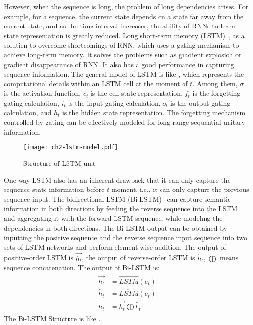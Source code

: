 However, when the sequence is long, the problem of long dependencies arises. For example, for a sequence, the current state depends on a state far away from the current state, and as the time interval increases, the ability of RNNs to learn state representation is greatly reduced. Long short-term memory (LSTM)~\cite{lstm1997}, as a solution to overcome shortcomings of RNN, which uses a gating mechanism to achieve long-term memory. It solves the problems such as gradient explosion or gradient disappearance of RNN. It also has a good performance in capturing sequence information. The general model of LSTM is like \figname{\ref{fig:ch2-lstm-model}}, which represents the computational details within an LSTM cell at the moment of \(t\). Among them, \(\sigma\) is the activation function, \(c_t\) is the cell state representation, \(f_t\) is the forgetting gating calculation, \(i_t\) is the input gating calculation, \(o_t\) is the output gating calculation, and \(h_t\) is the hidden state representation. The forgetting mechanism controlled by gating can be effectively modeled for long-range sequential unitary information.

\begin{figure}[htbp!]
    \centering
    \texttt{[image: ch2-lstm-model.pdf]}
    \caption{Structure of LSTM unit}\label{fig:ch2-lstm-model}
\end{figure}

One-way LSTM also has an inherent drawback that it can only capture the sequence state information before \(t\) moment, i.e., it can only capture the previous sequence input. The bidirectional LSTM (Bi-LSTM)~\cite{graves2005framewise} can capture semantic information in both directions by feeding the reverse sequence into the LSTM and aggregating it with the forward LSTM sequence, while modeling the dependencies in both directions. The Bi-LSTM output can be obtained by inputting the positive sequence and the reverse sequence input sequence into two sets of LSTM networks and perform element-wise addition. The output of positive-order LSTM is \(\overrightarrow{h_t}\), the output of reverse-order LSTM is \(\overleftarrow{h_t}\), \(\bigoplus \) means sequence concatenation. The output of Bi-LSTM is:
\begin{align}
    \begin{split}
        \overrightarrow{h_t} & = \overrightarrow{LSTM}(e_t)                       \\
        \overleftarrow{h_t}  & = \overleftarrow{LSTM}(e_t)                        \\
        h_t                  & =\overrightarrow{h_t}\bigoplus \overleftarrow{h_t}
    \end{split}
\end{align}
The Bi-LSTM Structure is like \figname{\ref{fig:ch2-model-bilstm}}.

